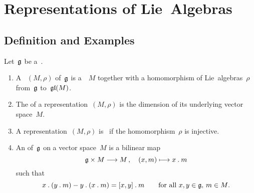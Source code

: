 \chapter{Representations of Lie~Algebras}







\section{Definition and Examples}


\begin{definition}
  Let~$\mathfrak{g}$ be a~{\liealgebra{$\kf$}}.
  \begin{enumerate}
    \item
      A ~$(M, \rho)$ of~$\mathfrak{g}$ is a~{\vectorspace{$\kf$}}~$M$ together with a homomorphism of Lie~algebras~$\rho$ from~$\mathfrak{g}$ to~$\mathfrak{gl}(M)$.
    \item
      The  of a representation~$(M, \rho)$ is the dimension of its underlying vector space~$M$.
    \item
      A representation~$(M, \rho)$ is~ if the homomorphism~$\rho$ is injective.
    \item
      An  of~$\mathfrak{g}$ on a vector space~$M$ is a bilinear map
      \[
        \glie \times M \to M \,,
        \quad
        (x,m) \mapsto x \act m
      \]
      such that
      \[
        x \mathbin{.} (y \mathbin{.} m) - y \mathbin{.} (x \mathbin{.} m)
        =
        [x,y] \mathbin{.} m
        \qquad
        \text{for all~$x, y \in \mathfrak{g}$,~$m \in M$.}
      \]
  \end{enumerate}
\end{definition}


